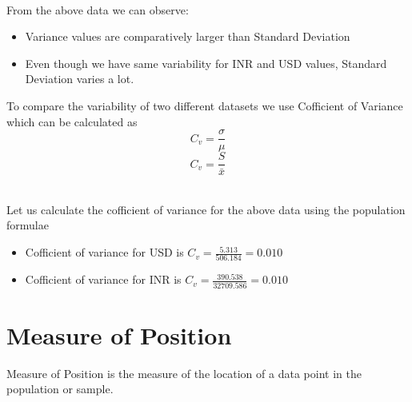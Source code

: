 \documentclass[twoside,12pt]{report}  %
\begin{document}
\noindent
\\
From the above data we can observe:
\begin{itemize}
	\item Variance values are comparatively larger than Standard Deviation
	\item Even though we have same variability for INR and USD values, Standard Deviation varies a lot. 
\end{itemize}
\noindent
To compare the variability of two different datasets we use Cofficient of Variance which can be calculated as
$$ C_v = \frac{\sigma}{\mu} $$
$$ C_v = \frac{S}{\bar{x}} $$
\\
\begin{tcolorbox}[colback=blue!5!white, colframe=blue!75!black, title = \textbf{Example}]
	Let us calculate the cofficient of variance for the above data using the population formulae
	\begin{itemize}
		\item Cofficient of variance for USD is $ C_v = \frac{5.313}{506.184} = 0.010 $
		\item Cofficient of variance for INR is $ C_v = \frac{390.538}{32709.586} = 0.010 $
	\end{itemize}
\end{tcolorbox}
\noindent
\section{Measure of Position}
Measure of Position is the measure of the location of a data point in the population or sample.
\\
\noindent
\end{document}
